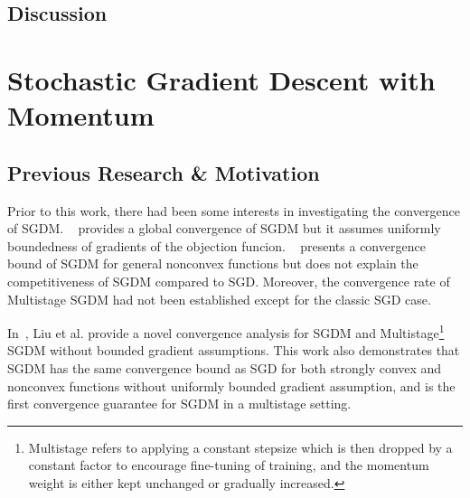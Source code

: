 \documentclass{article}
\begin{document}
\subsection{Discussion}
\section{Stochastic Gradient Descent with Momentum}
\label{section4}
\subsection{Previous Research \& Motivation}
Prior to this work, there had been some interests in investigating the convergence of SGDM.
~\cite{https://doi.org/10.48550/arxiv.1905.03817} provides a global convergence of SGDM but it assumes uniformly boundedness of gradients of the objection funcion.
~\cite{https://doi.org/10.48550/arxiv.1808.10396} presents a convergence bound of SGDM for general nonconvex functions but does not explain the competitiveness of SGDM compared to SGD.
Moreover, the convergence rate of Multistage SGDM had not been established except for the classic SGD case.

In~\cite{NEURIPS2020_d3f5d4de}, Liu et al. provide a novel convergence analysis for SGDM and
Multistage\footnote{Multistage refers to applying a constant stepsize which is then dropped by a constant factor to encourage fine-tuning of training, and the momentum weight is either kept unchanged or gradually increased.}
SGDM without bounded gradient assumptions. This work also demonstrates that SGDM has the same convergence bound as SGD for both strongly convex and nonconvex functions without uniformly bounded gradient assumption,
and is the first convergence guarantee for SGDM in a multistage setting.
\end{document}
